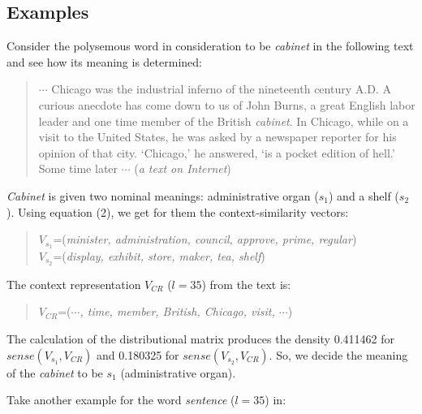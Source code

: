 \subsection{Examples}

Consider the polysemous word in consideration to be {\it cabinet} in the following text and see how 
its meaning is determined:

\vspace{0.3cm}
\begin{quote}
\small $\cdots$ Chicago was the industrial inferno of the nineteenth century A.D.  A curious anecdote 
has come down to us of John Burns, a great English labor leader and one time member of the British 
{\it cabinet}.  In Chicago, while on a visit to the United States, he was asked by a newspaper reporter
 for his opinion of that city.  `Chicago,' he answered, `is a pocket edition of hell.'  Some time 
later $\cdots$ ({\it a text on Internet})
\end{quote}
\vspace{0.2cm}
{\it Cabinet} is given two nominal meanings: administrative organ ($s_1$) and a shelf ($s_2$).  Using 
equation (2), we get for them the context-similarity vectors:
\begin{quote}
$V_{s_1}$=({\it minister, administration, council, approve, prime, regular}) \\
$V_{s_2}$=({\it display, exhibit, store, maker, tea, shelf})
\end{quote}
The context representation $V_{CR}$ ($l=35$) from the text is:
\begin{quote}
$V_{CR}$=({\it $\cdots$, time, member, British, Chicago, visit, $\cdots$})
\end{quote}
The calculation of the distributional matrix produces the density 0.411462 
for $sense(V_{s_1},V_{CR})$ and 0.180325 for $sense(V_{s_2},V_{CR})$.  So, we decide the meaning
 of the {\it cabinet} to be $s_1$ (administrative organ).

Take another example for the word {\it sentence} ($l=35$) in:

